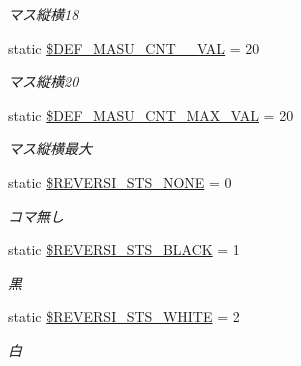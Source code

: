 \begin{DoxyCompactItemize}
\begin{DoxyCompactList}\small\item\em マス縦横18 \end{DoxyCompactList}\item 
\mbox{\label{class_reversi_const_ac987dbaa8da3871c3c35743aa26be89a}} 
static \hyperlink{class_reversi_const_ac987dbaa8da3871c3c35743aa26be89a}{\$\+D\+E\+F\+\_\+\+M\+A\+S\+U\+\_\+\+C\+N\+T\+\_\+\_\+\+V\+AL} = 20
\begin{DoxyCompactList}\small\item\em マス縦横20 \end{DoxyCompactList}\item 
\mbox{\label{class_reversi_const_ac57be288e8fbde4a2e620609ce02925b}} 
static \hyperlink{class_reversi_const_ac57be288e8fbde4a2e620609ce02925b}{\$\+D\+E\+F\+\_\+\+M\+A\+S\+U\+\_\+\+C\+N\+T\+\_\+\+M\+A\+X\+\_\+\+V\+AL} = 20
\begin{DoxyCompactList}\small\item\em マス縦横最大 \end{DoxyCompactList}\item 
\mbox{\label{class_reversi_const_aafea7fe2f84562cd883a884285ded09c}} 
static \hyperlink{class_reversi_const_aafea7fe2f84562cd883a884285ded09c}{\$\+R\+E\+V\+E\+R\+S\+I\+\_\+\+S\+T\+S\+\_\+\+N\+O\+NE} = 0
\begin{DoxyCompactList}\small\item\em コマ無し \end{DoxyCompactList}\item 
\mbox{\label{class_reversi_const_a02fbb6f48064d833739f11e6c166d342}} 
static \hyperlink{class_reversi_const_a02fbb6f48064d833739f11e6c166d342}{\$\+R\+E\+V\+E\+R\+S\+I\+\_\+\+S\+T\+S\+\_\+\+B\+L\+A\+CK} = 1
\begin{DoxyCompactList}\small\item\em 黒 \end{DoxyCompactList}\item 
\mbox{\label{class_reversi_const_a7d7cce1f800aec960277bcfafe5eb9c2}} 
static \hyperlink{class_reversi_const_a7d7cce1f800aec960277bcfafe5eb9c2}{\$\+R\+E\+V\+E\+R\+S\+I\+\_\+\+S\+T\+S\+\_\+\+W\+H\+I\+TE} = 2
\begin{DoxyCompactList}\small\item\em 白 \end{DoxyCompactList}\item 

\end{DoxyCompactItemize}
